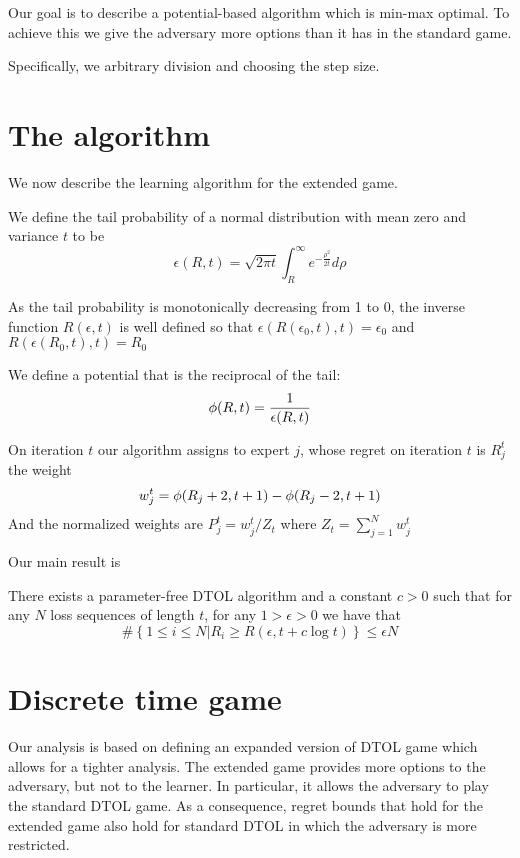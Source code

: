 \documentclass[12pt]{article} %
\begin{document}
Our goal is to describe a potential-based algorithm which is min-max
optimal. To achieve this we give the adversary more options than it
has in the standard game.

Specifically, we arbitrary division and choosing the step size.


\section{The algorithm}

We now describe the learning algorithm for the extended game.

We define the tail probability of a normal distribution with mean zero
and variance $t$ to be
\begin{equation}
\epsilon(R,t) = \sqrt{2 \pi t} \int_R^\infty e^{-\frac{\rho^2}{2t}} d\rho
\end{equation}

As the tail probability is monotonically decreasing from 1 to 0, the
inverse function $R(\epsilon,t)$ is well defined so that
$\epsilon(R(\epsilon_0,t),t)=\epsilon_0$ and $R(\epsilon(R_0,t),t) =R_0$

We define a potential that is the reciprocal of the tail:
$$\phi(R,t) = \frac{1}{\epsilon(R,t)}$$

On iteration $t$ our algorithm assigns to expert $j$, whose
regret on iteration $t$ is $R^t_j$ the weight
$$w^t_j = \phi(R_j+2,t+1) - \phi(R_j-2,t+1)$$
And the normalized weights are $P_j^t = w^t_j/Z_t$ where $Z_t =
\sum_{j=1}^N w_j^t$

Our main result is
\begin{theorem}
  There exists a parameter-free DTOL algorithm and a constant $c>0$
  such that for any $N$ loss sequences of length $t$, for any $1>\epsilon>0$ we
  have that
  \[
    \#\left\{ 1 \leq i \leq N \left| R_i \geq R(\epsilon,t+c \log t)
    \right.\right\} \leq \epsilon N
  \]
\end{theorem}

\section{Discrete time game}
\label{sec:discrete}

Our analysis is based on defining an expanded version of DTOL game which
allows for a tighter analysis. The extended game provides more options
to the adversary, but not to the learner. In particular, it allows the
adversary to play the standard DTOL game. As a consequence, regret bounds
that hold for the extended game also hold for standard DTOL in which
the adversary is more restricted.
\end{document}
